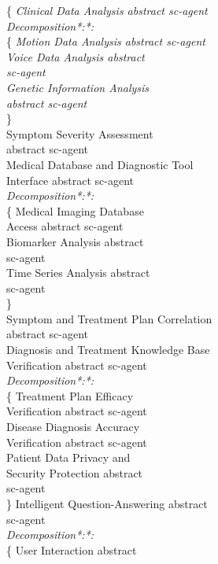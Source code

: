 \documentclass[a4paper,10pt,twocolumn]{article}
\begin{document}
\{ \bullet \textit{Clinical Data Analysis abstract sc-agent}\\
\Rightarrow \textit{Decomposition*:*:}   \\
\{ \bullet \textit{Motion Data Analysis abstract sc-agent}\\
\bullet \textit{Voice Data Analysis abstract\\
sc-agent}\\
\bullet \textit{ Genetic Information Analysis\\ abstract sc-agent}\\
\}\\
\bullet Symptom Severity Assessment \\ abstract
sc-agent\\
\bullet Medical Database and Diagnostic Tool\\
Interface abstract sc-agent\\
\Rightarrow \textit{Decomposition*:*:} \\
 \{ \bullet  Medical Imaging Database\\
Access abstract sc-agent\\
\bullet Biomarker Analysis abstract\\
sc-agent\\
\bullet Time Series Analysis abstract\\
sc-agent\\
\}\\
\bullet Symptom and Treatment Plan Correlation\\
abstract sc-agent\\
\bullet Diagnosis and Treatment Knowledge Base\\
Verification abstract sc-agent\\
\Rightarrow \textit{Decomposition*:*:} \\
\{ \bullet Treatment Plan Efficacy\\
Verification abstract sc-agent\\
\bullet Disease Diagnosis Accuracy\\
Verification abstract sc-agent\\
\bullet Patient Data Privacy and\\
Security Protection abstract \\sc-agent\\
\}
\bullet Intelligent Question-Answering abstract\\
sc-agent\\
\Rightarrow \textit{Decomposition*:*:} \\
\{ \bullet User Interaction abstract\\
\end{document}
